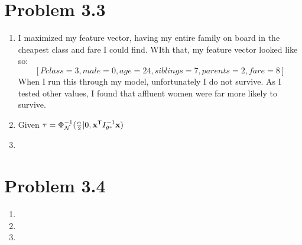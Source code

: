 \documentclass{article}
\begin{document}
\section*{Problem 3.3}
\begin{enumerate}[label=(\alph*)]
  \item I maximized my feature vector, having my entire family on board in the cheapest class and fare I could find. WIth that, my feature vector looked like so: \[[Pclass=3, male=0, age=24, siblings=7, parents=2, fare=8]\] When I run this through my model, unfortunately I do not survive. As I tested other values, I found that affluent women were far more likely to survive. 
  \item Given $\tau = \Phi^{-1}_{\mathcal{N}}(\frac{\alpha}{2} | 0, \textbf{x}^{\sf{T}}I^{-1}_{\theta^*}\textbf{x})$
  \item 
\end{enumerate}

\section*{Problem 3.4}
\begin{enumerate}[label=(\alph*)]
  \item 
  \item 
  \item 
\end{enumerate}
\end{document}
